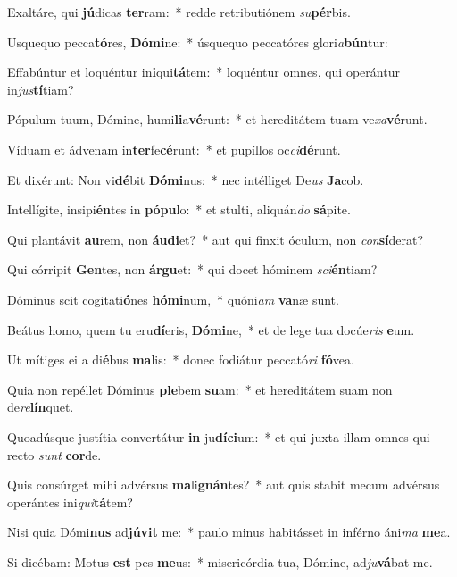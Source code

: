 \item Exaltáre, qui \textbf{jú}dicas \textbf{ter}ram:~* redde retributiónem \textit{su}\textbf{pér}bis.
\item Usquequo pecca\textbf{tó}res, \textbf{Dó}\textbf{mi}ne:~* úsquequo peccatóres glori\textit{a}\textbf{bún}tur:
\item Effabúntur et loquéntur in\textbf{i}qui\textbf{tá}tem:~* loquéntur omnes, qui operántur in\textit{jus}\textbf{tí}tiam?
\item Pópulum tuum, Dómine, humi\textbf{li}a\textbf{vé}runt:~* et hereditátem tuam ve\textit{xa}\textbf{vé}runt.
\item Víduam et ádvenam in\textbf{ter}fe\textbf{cé}runt:~* et pupíllos oc\textit{ci}\textbf{dé}runt.
\item Et dixérunt: Non vi\textbf{dé}bit \textbf{Dó}\textbf{mi}nus:~* nec intélliget De\textit{us} \textbf{Ja}cob.
\item Intellígite, insipi\textbf{én}tes in \textbf{pó}\textbf{pu}lo:~* et stulti, aliquán\textit{do} \textbf{sá}pite.
\item Qui plantávit \textbf{au}rem, non \textbf{áu}\textbf{di}et?~* aut qui finxit óculum, non \textit{con}\textbf{sí}derat?
\item Qui córripit \textbf{Gen}tes, non \textbf{ár}\textbf{gu}et:~* qui docet hóminem \textit{sci}\textbf{én}tiam?
\item Dóminus scit cogitati\textbf{ó}nes \textbf{hó}\textbf{mi}num,~* quóni\textit{am} \textbf{va}næ sunt.
\item Beátus homo, quem tu eru\textbf{dí}eris, \textbf{Dó}\textbf{mi}ne,~* et de lege tua docúe\textit{ris} \textbf{e}um.
\item Ut mítiges ei a di\textbf{é}bus \textbf{ma}lis:~* donec fodiátur peccató\textit{ri} \textbf{fó}vea.
\item Quia non repéllet Dóminus \textbf{ple}bem \textbf{su}am:~* et hereditátem suam non de\textit{re}\textbf{lín}quet.
\item Quoadúsque justítia convertátur \textbf{in} ju\textbf{dí}\textbf{ci}um:~* et qui juxta illam omnes qui recto \textit{sunt} \textbf{cor}de.
\item Quis consúrget mihi advérsus \textbf{ma}li\textbf{gnán}tes?~* aut quis stabit mecum advérsus operántes ini\textit{qui}\textbf{tá}tem?
\item Nisi quia Dómi\textbf{nus} ad\textbf{jú}\textbf{vit} me:~* paulo minus habitásset in inférno áni\textit{ma} \textbf{me}a.
\item Si dicébam: Motus \textbf{est} pes \textbf{me}us:~* misericórdia tua, Dómine, ad\textit{ju}\textbf{vá}bat me.
